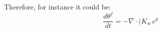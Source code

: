 Therefore, for instance it could be:
\begin{equation}
\frac{d \theta^f}{dt} = - {\nabla}\cdot  (K_w\, c^g
\end{equation}